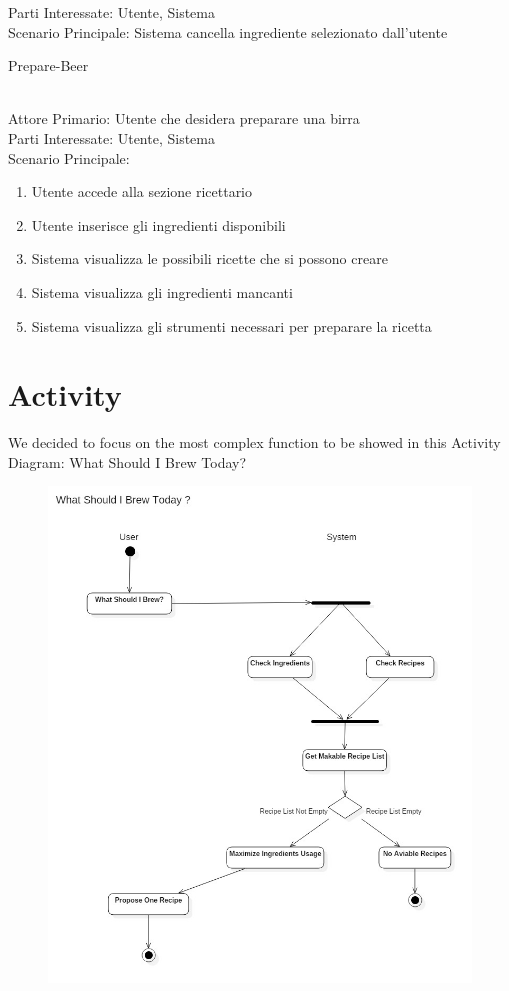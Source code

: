 \documentclass[12pt]{article}
\begin{document}
Parti Interessate: Utente, Sistema\\
Scenario Principale: Sistema cancella ingrediente selezionato dall'utente
\bigskip
\\
\begin{itshape}
Prepare-Beer
\end{itshape}\\
Attore Primario: Utente che desidera preparare una birra\\ 
Parti Interessate: Utente, Sistema\\
Scenario Principale:
\begin{enumerate}
\item Utente accede alla sezione ricettario
\item Utente inserisce gli ingredienti disponibili
\item Sistema visualizza le possibili ricette che si possono creare
\item Sistema visualizza gli ingredienti mancanti
\item Sistema visualizza gli strumenti necessari per preparare la ricetta
\end{enumerate}
\pagebreak
\section{Activity}
We decided to focus on the most complex function to be showed in this Activity Diagram: What Should I Brew Today?\\
\begin{figure}[H]
\includegraphics[scale=0.49]{ActivityDiagram.jpg}
\centering
\end{figure}
\pagebreak
\end{document}
